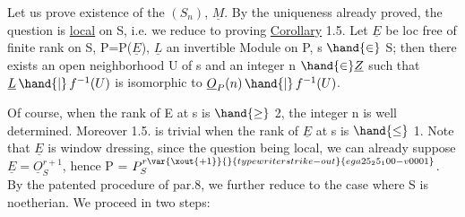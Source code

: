 
Let us prove existence of the $(S_n)$, $\underline{M}$. By the uniqueness already proved,
the question is \uline{local} on S, i.e. we reduce to proving
\uline{Corollary} 1.5. Let $\underline{E}$ be loc free of finite rank on S, P=P($\underline{E}$), $\underline{L}$ an
invertible Module on P, s $\hand{\in}$ S; then there exists an open neighborhood U of s
and an integer n $\hand{\in} \underline{Z}$ such that $\underline{L}\,\hand{|}\,f^{-1}(U)$ is isomorphic to $\underline{O}_P(n)\,\hand{|}\,f^{-1}(U)$.

\hand{\unsure{[|(}}Of course, when the rank of E at s is $\hand{\geq}$ 2, the integer n is
well determined. Moreover 1.5. is trivial when the rank of $\underline{E}$ at s is $\hand{\leq}$ 1\hand{\unsure{]|)}}.
Note that $\underline{E}$ is window dressing, since the question being local, we can already suppose
$\underline{E} = \underline{O}_S^{r+1}$, hence P = $P_S^{r\var{\xout{+1}}{}{typewriter strike-out}{ega25_25_100-v0001}}$\hand{\unsure{]}}. By the patented procedure of par.8, we
further reduce to the case where S is noetherian. We proceed in two steps:


